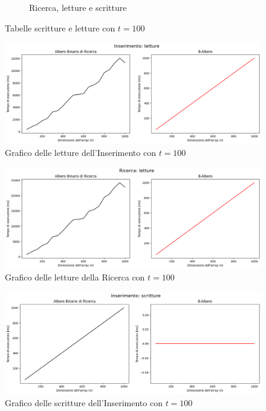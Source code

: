 \begin{figure}[H]
\begin{subfigure}[b]{0.49\textwidth}
        \caption{Ricerca, letture e scritture}
        \label{fig:tablesearchwr100}
    \end{subfigure}
    \caption{Tabelle scritture e letture con $t=100$}
    \label{fig:tablewr100}
\end{figure}

\begin{figure}[H]
    \centering
    \includegraphics[width=\textwidth]{side-graphs/insert-r-t100.png}
    \caption{Grafico delle letture dell'Inserimento con $t=100$}
    \label{fig:sidegraphinsertread100}
\end{figure}
    
\begin{figure}[H]
    \centering
    \includegraphics[width=\textwidth]{side-graphs/search-r-t100.png}
    \caption{Grafico delle letture della Ricerca con $t=100$}
    \label{fig:sidegraphsearchread100}
\end{figure}

\begin{figure}[H]
    \centering
    \includegraphics[width=\textwidth]{side-graphs/insert-w-t100.png}
    \caption{Grafico delle scritture dell'Inserimento con $t=100$}
    \label{fig:sidegraphinsertwrite100}
\end{figure}
    

